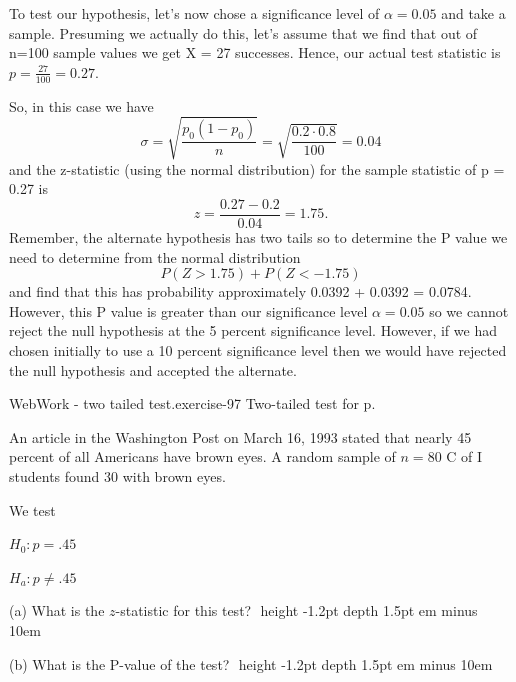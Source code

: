 \documentclass[10pt,]{book}
\newcommand{\fillin}[1]{\leavevmode\leaders\vrule height -1.2pt depth 1.5pt \hskip #1em minus #1em \null}
\numberwithin{equation}{section}
\newcommand{\lt}{<}
\newcommand{\gt}{>}
\begin{document}
\par
\hypertarget{p-1375}{}%
To test our hypothesis, let's now chose a significance level of \(\alpha = 0.05\) and take a sample. Presuming we actually do this, let's assume that we find that out of n=100 sample values we get X = 27 successes. Hence, our actual test statistic is \(p = \frac{27}{100} = 0.27\).%
\par
\hypertarget{p-1376}{}%
So, in this case we have%
\begin{equation*}
\sigma = \sqrt{\frac{p_0(1-p_0)}{n}} = \sqrt{\frac{0.2 \cdot 0.8}{100}} = 0.04
\end{equation*}
and the z-statistic (using the normal distribution) for the sample statistic of p = 0.27 is%
\begin{equation*}
z = \frac{0.27 - 0.2}{0.04} = 1.75.
\end{equation*}
Remember, the alternate hypothesis has two tails so to determine the P value we need to determine from the normal distribution%
\begin{equation*}
P(Z \gt 1.75) + P(Z \lt -1.75)
\end{equation*}
and find that this has probability approximately 0.0392 + 0.0392 = 0.0784.  However, this P value is greater than our significance level \(\alpha = 0.05\) so we cannot reject the null hypothesis at the 5 percent significance level. However, if we had chosen initially to use a 10 percent significance level then we would have rejected the null hypothesis and accepted the alternate.%
\par
\hypertarget{p-1377}{}%
\begin{inlineexercise}{WebWork - two tailed test.}{exercise-97}%
\hypertarget{p-1378}{}%
Two-tailed test for p.%
\par\medskip
\hypertarget{p-1379}{}%
An article in the Washington Post on March 16, 1993 stated that nearly 45 percent of  all Americans have brown eyes.  A random sample of \(n = 
80\) C of I students found 30 with brown eyes.%
\par
\hypertarget{p-1380}{}%
We test%
\par
\hypertarget{p-1381}{}%
\(H_0: p = .45\)%
\par
\hypertarget{p-1382}{}%
\(H_a: p \neq .45\)%
\par
\hypertarget{p-1383}{}%
(a) What is the \(z\)-statistic for this test? \(\)  \fillin{10}%
\par
\hypertarget{p-1384}{}%
(b) What is the P-value of the test?  \(\)  \fillin{10}%
\end{inlineexercise}
\end{document}
